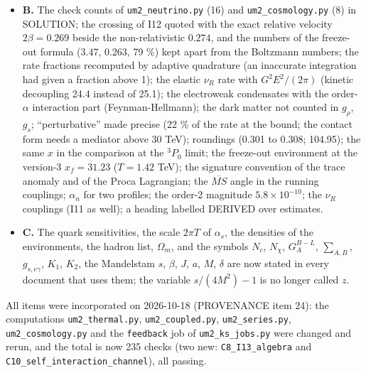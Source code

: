 \documentclass[
  10pt,
]{article}
\begin{document}
\begin{itemize}
  \(G_\lambda \le 2.3\times10^{-15}\) GeV\(^{-2}\) (ASSUMED);
  \(\lambda_B\) is only the Kohn-Sham test value.
\item
  \textbf{B.} The check counts of \texttt{um2\_neutrino.py} (16) and
  \texttt{um2\_cosmology.py} (8) in SOLUTION; the crossing of I12 quoted
  with the exact relative velocity \(2\beta = 0.269\) beside the
  non-relativistic \(0.274\), and the numbers of the freeze-out formula
  (3.47, 0.263, 79 \%) kept apart from the Boltzmann numbers; the rate
  fractions recomputed by adaptive quadrature (an inaccurate integration
  had given a fraction above 1); the elastic \(\nu_R\) rate with
  \(G^2E^2/(2\pi)\) (kinetic decoupling 24.4 instead of 25.1); the
  electroweak condensates with the order-\(\alpha\) interaction part
  (Feynman-Hellmann); the dark matter not counted in \(g_\rho\),
  \(g_s\); ``perturbative'' made precise (22 \% of the rate at the
  bound; the contact form needs a mediator above 30 TeV); roundings
  (0.301 to 0.308; 104.95); the same \(x\) in the comparison at the
  \(^3P_0\) limit; the freeze-out environment at the version-3
  \(x_f = 31.23\) (\(T = 1.42\) TeV); the signature convention of the
  trace anomaly and of the Proca Lagrangian; the \(\overline{MS}\) angle
  in the running couplings; \(\alpha_n\) for two profiles; the order-2
  magnitude \(5.8\times10^{-10}\); the \(\nu_R\) couplings (I11 as
  well); a heading labelled DERIVED over estimates.
\item
  \textbf{C.} The quark sensitivities, the scale \(2\pi T\) of
  \(\alpha_s\), the densities of the environments, the hadron list,
  \(\Omega_m\), and the symbols \(N_c\), \(N_\chi\), \(G_A^{B-L}\),
  \(\sum_{A,B}\), \(g_{s,e\gamma}\), \(K_1\), \(K_2\), the Mandelstam
  \(s\), \(\beta\), \(J\), \(a\), \(M\), \(\delta\) are now stated in
  every document that uses them; the variable \(s/(4M^2) - 1\) is no
  longer called \(z\).
\end{itemize}

All items were incorporated on 2026-10-18 (PROVENANCE item 24): the
computations \texttt{um2\_thermal.py}, \texttt{um2\_coupled.py},
\texttt{um2\_series.py}, \texttt{um2\_cosmology.py} and the
\texttt{feedback} job of \texttt{um2\_ks\_jobs.py} were changed and
rerun, and the total is now 235 checks (two new:
\texttt{C8\_I13\_algebra} and \texttt{C10\_self\_interaction\_channel}),
all passing.
\end{document}

